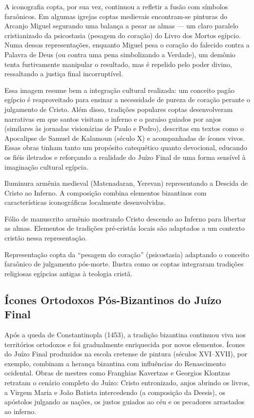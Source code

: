 A iconografia copta, por sua vez, continuou a refletir a fusão com símbolos faraônicos. Em algumas igrejas coptas medievais encontram-se pinturas do Arcanjo Miguel segurando uma balança a pesar as almas --- um claro paralelo cristianizado da psicostasia (pesagem do coração) do Livro dos Mortos egípcio. Numa dessas representações, enquanto Miguel pesa o coração do falecido contra a Palavra de Deus (ou contra uma pena simbolizando a Verdade), um demônio tenta furtivamente manipular o resultado, mas é repelido pelo poder divino, ressaltando a justiça final incorruptível.

Essa imagem resume bem a integração cultural realizada: um conceito pagão egípcio é reaproveitado para ensinar a necessidade de pureza de coração perante o julgamento de Cristo. Além disso, tradições populares coptas desenvolveram narrativas em que santos visitam o inferno e o paraíso guiados por anjos (similares às jornadas visionárias de Paulo e Pedro), descritas em textos como o Apocalipse de Samuel de Kalamoun (século X) e acompanhadas de ícones vivos. Essas obras tinham tanto um propósito catequético quanto devocional, educando os fiéis iletrados e reforçando a realidade do Juízo Final de uma forma sensível à imaginação cultural egípcia.

Iluminura armênia medieval (Matenadaran, Yerevan) representando a Descida de Cristo ao Inferno. A composição combina elementos bizantinos com características iconográficas localmente desenvolvidas.

Fólio de manuscrito armênio mostrando Cristo descendo ao Inferno para libertar as almas. Elementos de tradições pré-cristãs locais são adaptados a um contexto cristão nessa representação.

Representação copta da “pesagem do coração” (psicostasia) adaptando o conceito faraônico de julgamento pós-morte. Ilustra como os coptas integraram tradições religiosas egípcias antigas à teologia cristã.

\subsection{Ícones Ortodoxos Pós-Bizantinos do Juízo Final}

Após a queda de Constantinopla (1453), a tradição bizantina continuou viva nos territórios ortodoxos e foi gradualmente enriquecida por novos elementos. Ícones do Juízo Final produzidos na escola cretense de pintura (séculos XVI--XVII), por exemplo, combinam a herança bizantina com influências do Renascimento ocidental. Obras de mestres como Franghias Kavertzas e Georgios Klontzas retratam o cenário completo do Juízo: Cristo entronizado, anjos abrindo os livros, a Virgem Maria e João Batista intercedendo (a composição da Deesis), os apóstolos julgando as nações, os justos guiados ao céu e os pecadores arrastados ao inferno.

